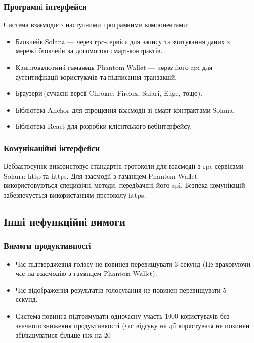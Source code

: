\documentclass[14pt]{extreport}
\begin{document}
  \subsubsection{Програмні інтерфейси}
  Система взаємодіє з наступними програмними компонентами:
  \begin{itemize}
    \item Блокчейн Solana — через \gls{rpc}-сервіси для запису та зчитування даних з мережі блокчейн за допомогою смарт-контрактів.
    \item Криптовалютний гаманець Phantom Wallet — через його \gls{api} для аутентифікації користувачів та підписання транзакцій.
    \item Браузери (сучасні версії Chrome, Firefox, Safari, Edge, тощо).
    \item Бібліотека Anchor для спрощення взаємодії зі смарт-контрактами Solana.
    \item Бібліотека React для розробки клієнтського вебінтерфейсу.
  \end{itemize}
  
  \subsubsection{Комунікаційні інтерфейси}
  Вебзастосунок використовує стандартні протоколи для взаємодії з \gls{rpc}-сер\-вісами Solana: \gls{http} та \gls{https}. Для взаємодії з гаманцем Phantom Wallet використовуються специфічні методи, передбачені його \gls{api}. Безпека комунікацій забезпечується використанням протоколу \gls{https}.
  
  \subsection{Інші нефункційні вимоги}
  \subsubsection{Вимоги продуктивності}
  \begin{itemize}
    \item Час підтвердження голосу не повинен перевищувати 3 секунд (Не враховуючи час на взаємодію з гаманцем Phantom Wallet).
    \item Час відображення результатів голосування не повинен перевищувати 5 секунд.  
    \item Система повинна підтримувати одночасну участь 1000 користувачів без значного зниження продуктивності (час відгуку на дії користувача не повинен збільшуватися більше ніж на 20%
  \end{itemize}
\end{document}
